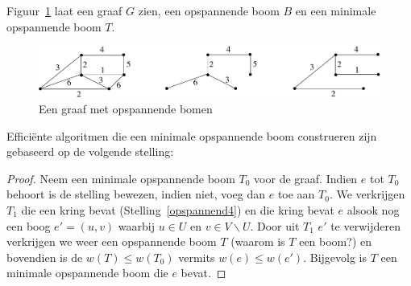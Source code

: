 
Figuur~\ref{opspannend1} laat een graaf $G$ zien, een opspannende boom $B$
en een minimale opspannende boom $T$.

\begin{figure}[ht]
\begin{center}
\includegraphics[width=0.6\linewidth,keepaspectratio]{opspannend1}
\end{center}
\caption{Een graaf met opspannende bomen\label{opspannend1}}
\end{figure}


Effici\"ente algoritmen die een minimale opspannende boom construeren
zijn gebaseerd op de volgende stelling:

\begin{proof} Neem een minimale opspannende boom $T_{0}$ voor de
graaf. Indien $e$ tot $T_{0}$ behoort is de stelling bewezen, indien
niet, voeg dan $e$ toe aan $T_{0}$. We verkrijgen $T_{1}$ die een kring
bevat (Stelling~\ref{opspannend4}) en die kring bevat $e$ alsook nog een 
boog $e' = (u,v)$
 waarbij $u \in U$ en $v \in V \backslash U$. Door uit $T_{1}$ $e'$ te
verwijderen verkrijgen we weer een opspannende boom $T$ (waarom is $T$ een
boom?) en bovendien is de 
$w(T) \leq w(T_{0})$ vermits $w(e)
\leq w(e')$. Bijgevolg is $T$ een minimale opspannende boom die $e$
bevat.
\end{proof}



